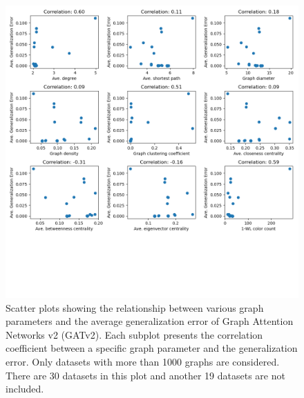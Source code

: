 \begin{figure}[H]
    \centering
    \includegraphics[width=\textwidth]{images/correlation_ignore_less_than_1000_GATv2.png}
    \caption{Scatter plots showing the relationship between various graph parameters and the average generalization error of Graph Attention Networks v2 (GATv2). Each subplot presents the correlation coefficient between a specific graph parameter and the generalization error. Only datasets with more than 1000 graphs are considered. There are 30 datasets in this plot and another 19 datasets are not included.}
    \label{fig:correlation_ignore_less_than_1000_GATv2}
\end{figure}

